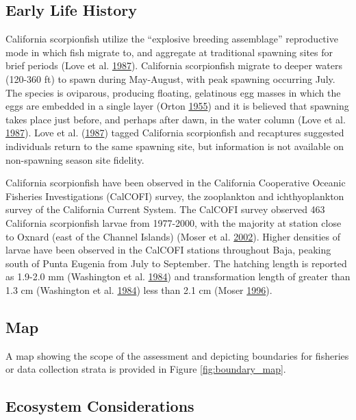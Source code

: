 \documentclass[12pt,]{article}
\begin{document}
\subsection{Early Life History}\label{early-life-history}

California scorpionfish utilize the ``explosive breeding assemblage''
reproductive mode in which fish migrate to, and aggregate at traditional
spawning sites for brief periods (Love et al.
\protect\hyperlink{ref-Love1987}{1987}). California scorpionfish migrate
to deeper waters (120-360 ft) to spawn during May-August, with peak
spawning occurring July. The species is oviparous, producing floating,
gelatinous egg masses in which the eggs are embedded in a single layer
(Orton \protect\hyperlink{ref-Orton1955}{1955}) and it is believed that
spawning takes place just before, and perhaps after dawn, in the water
column (Love et al. \protect\hyperlink{ref-Love1987}{1987}). Love et al.
(\protect\hyperlink{ref-Love1987}{1987}) tagged California scorpionfish
and recaptures suggested individuals return to the same spawning site,
but information is not available on non-spawning season site fidelity.

California scorpionfish have been observed in the California Cooperative
Oceanic Fisheries Investigations (CalCOFI) survey, the zooplankton and
ichthyoplankton survey of the California Current System. The CalCOFI
survey observed 463 California scorpionfish larvae from 1977-2000, with
the majority at station close to Oxnard (east of the Channel Islands)
(Moser et al. \protect\hyperlink{ref-Moser2002}{2002}). Higher densities
of larvae have been observed in the CalCOFI stations throughout Baja,
peaking south of Punta Eugenia from July to September. The hatching
length is reported as 1.9-2.0 mm (Washington et al.
\protect\hyperlink{ref-Washington1984}{1984}) and transformation length
of greater than 1.3 cm (Washington et al.
\protect\hyperlink{ref-Washington1984}{1984}) less than 2.1 cm (Moser
\protect\hyperlink{ref-Moser1996}{1996}).

\subsection{Map}\label{map}

A map showing the scope of the assessment and depicting boundaries for
fisheries or data collection strata is provided in Figure
\ref{fig:boundary_map}.

\subsection{Ecosystem Considerations}\label{ecosystem-considerations-1}
\end{document}
